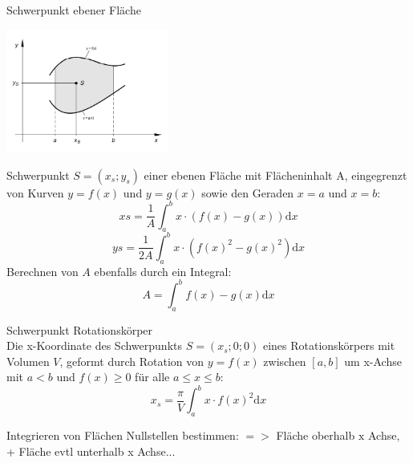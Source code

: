 \begin{theorem}{Schwerpunkt ebener Fläche}\\
  \begin{center}
  \includegraphics[width=0.4\textwidth]{images/Schwerpunkt_Beispiel.png}
  \end{center}
Schwerpunkt \(S=(x_s;y_s)\) einer ebenen Fläche mit Flächeninhalt A, eingegrenzt von Kurven \(y=f(x)\) und \(y=g(x)\)
sowie den Geraden \(x=a\) und \(x=b\):
\[xs = \frac{1}{A}\int_a^b{x\cdot(f(x)-g(x))\mathrm{d}x} \]
\[ys = \frac{1}{2A}\int_a^b{x\cdot(f(x)^2-g(x)^2)\mathrm{d}x} \]
Berechnen von \(A\) ebenfalls durch ein Integral:
\[A=\int_a^b{f(x)-g(x)\mathrm{d}x} \]
\end{theorem}
\begin{theorem}{Schwerpunkt Rotationskörper}\\
    Die x-Koordinate des Schwerpunkts \(S=(x_s;0;0) \) eines Rotationskörpers mit Volumen \(V\), geformt durch Rotation
    von \(y=f(x)\) zwischen \([a,b]\) um x-Achse mit \(a<b\) und \(f(x) \ge 0 \) für alle \(a \le x \le b \):
    \[x_s = \frac{\pi}{V}\int_a^b{x\cdot f(x)^2\mathrm{d}x} \]
\end{theorem}

\begin{KR}{Integrieren von Flächen}
    Nullstellen bestimmen: $=>$ Fläche oberhalb $\mathrm{x}$ Achse, + Fläche evtl unterhalb x Achse...
    \end{KR}
